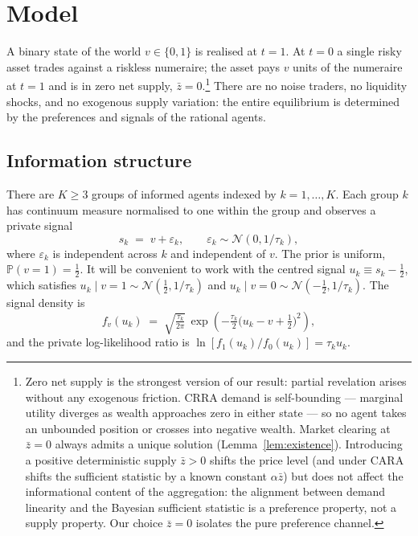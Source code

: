 \documentclass[12pt,letterpaper]{article}
\theoremstyle{definition}
\theoremstyle{remark}
\newcommand{\PP}{\mathbb{P}}
\newcommand{\1}{\mathbf{1}}
\begin{document}
\section{Model}\label{sec:model}

A binary state of the world $v\in\{0,1\}$ is realised at $t=1$. At $t=0$ a
single risky asset trades against a riskless numeraire; the asset pays $v$
units of the numeraire at $t=1$ and is in zero net supply,
$\bar{z}=0$.\footnote{Zero net supply is the strongest version of our
result: partial revelation arises without any exogenous friction. CRRA
demand is self-bounding ---  marginal utility diverges as wealth
approaches zero in either state --- so no agent takes an unbounded
position or crosses into negative wealth. Market clearing at
$\bar{z}=0$ always admits a unique solution
(Lemma~\ref{lem:existence}). Introducing a positive deterministic
supply $\bar{z}>0$ shifts the price level (and under CARA shifts the
sufficient statistic by a known constant $\alpha\bar{z}$) but does not
affect the informational content of the aggregation: the alignment
between demand linearity and the Bayesian sufficient statistic is a
preference property, not a supply property. Our choice $\bar{z}=0$
isolates the pure preference channel.} There are no noise traders, no
liquidity shocks, and no exogenous supply variation: the entire
equilibrium is determined by the preferences and signals of the
rational agents.

\subsection{Information structure}

There are $K\geq 3$ groups of informed agents indexed by $k=1,\ldots,K$.
Each group $k$ has continuum measure normalised to one within the group and
observes a private signal
\begin{equation}
   s_{k} \;=\; v + \varepsilon_{k}, \qquad
   \varepsilon_{k}\sim\mathcal{N}(0,1/\tau_{k}),
\label{eq:signal}
\end{equation}
where $\varepsilon_{k}$ is independent across $k$ and independent of $v$.
The prior is uniform, $\PP(v=1)=\tfrac12$. It will be convenient to work
with the centred signal $u_{k}\equiv s_{k}-\tfrac12$, which satisfies
\(u_{k}\mid v=1\sim\mathcal{N}(\tfrac12,1/\tau_{k})\) and
\(u_{k}\mid v=0\sim\mathcal{N}(-\tfrac12,1/\tau_{k})\). The signal density is
\begin{equation}
   f_{v}(u_{k}) \;=\; \sqrt{\tfrac{\tau_{k}}{2\pi}}\,
   \exp\!\left(-\tfrac{\tau_{k}}{2}\bigl(u_{k}-v+\tfrac12\bigr)^{2}\right),
\label{eq:density}
\end{equation}
and the private log-likelihood ratio is
\(\ln[f_{1}(u_{k})/f_{0}(u_{k})] = \tau_{k}u_{k}\).
\end{document}
